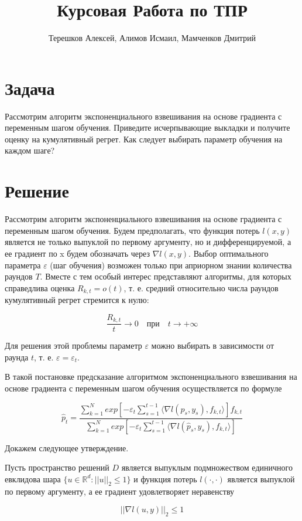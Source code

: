 \documentclass{article}
\title{Курсовая Работа по ТПР}
\author{Терешков Алексей, Алимов Исмаил, Мамченков Дмитрий}
\date{}
\begin{document}
\maketitle

\section{Задача}
Рассмотрим алгоритм экспоненциального взвешивания на основе градиента с переменным шагом обучения. Приведите исчерпывающие выкладки и получите оценку на кумулятивный регрет. Как следует выбирать параметр обучения на каждом шаге?

\section{Решение}
Рассмотрим алгоритм экспоненциального взвешивания на основе градиента с переменным шагом обучения. Будем предполагать, что функция потерь $l(x, y)$ является не только выпуклой по первому аргументу, но и дифференцируемой, а ее градиент по x будем обозначать через $\nabla l(x, y)$. Выбор оптимального параметра $\varepsilon$ (шаг обучения) возможен только при априорном знании количества раундов $T$. Вместе с тем особый интерес представляют алгоритмы, для которых справедлива оценка $R_{k,t} =o(t)$, т. е. средний относительно числа раундов кумулятивный регрет стремится к нулю:

\[
\frac{R_{k,t}}{t} \rightarrow 0 \quad при \quad t \rightarrow +\infty
\]

Для решения этой проблемы параметр $\varepsilon$ можно выбирать в зависимости от раунда $t$, т. е. $\varepsilon = \varepsilon_t$.

В такой постановке предсказание алгоритмом экспоненциального взвешивания на основе градиента  с переменным шагом обучения осуществляется по формуле

\[
\hat{p}_t = \frac{ \sum^N_{k=1} exp[-\varepsilon_t \sum^{t-1}_{s=1} \langle \nabla l(\hat{p}_s, y_s), f_{k,t} \rangle ] f_{k,t} }{ \sum^N_{k=1} exp[-\varepsilon_t \sum^{t-1}_{s=1} \langle \nabla l(\hat{p}_s, y_s), f_{k,t} \rangle ] }
\]

Докажем следующее утверждение.

Пусть пространство решений $D$ является выпуклым подмножеством единичного евклидова шара $\{ u \in \mathbb{R} ^d : \lvert \lvert  u\lvert \lvert_2 \le 1\}$ и функция потерь $l(\cdot, \cdot)$ является
выпуклой по первому аргументу, а ее градиент удовлетворяет неравенству

\[
\lvert \lvert \nabla l(u, y) \lvert \lvert_2 \le 1
\]
\end{document}
